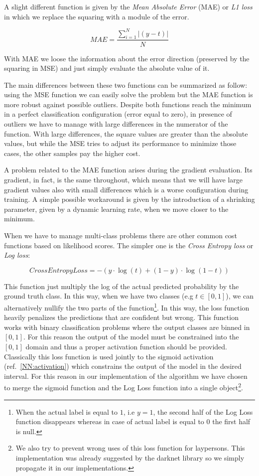\documentclass{standalone}
\begin{document}
A slight different function is given by the \emph{Mean Absolute Error} (MAE) or \emph{L1 loss} in which we replace the squaring with a module of the error.

$$
MAE = \frac{\sum_{i=1}^{N}|\left( y - t \right)|}{N}
$$

With MAE we loose the information about the error direction (preserved by the squaring in MSE) and just simply evaluate the absolute value of it.

The main differences between these two functions can be summarized as follow: using the MSE function we can easily solve the problem but the MAE function is more robust against possible outliers.
Despite both functions reach the minimum in a perfect classification configuration (error equal to zero), in presence of outliers we have to manage with large differences in the numerator of the function.
With large differences, the square values are greater than the absolute values, but while the MSE tries to adjust its performance to minimize those cases, the other samples pay the higher cost.

A problem related to the MAE function arises during the gradient evaluation.
Its gradient, in fact, is the same throughout, which means that we will have large gradient values also with small differences which is a worse configuration during training.
A simple possible workaround is given by the introduction of a shrinking parameter, given by a dynamic learning rate, when we move closer to the minimum.

When we have to manage multi-class problems there are other common cost functions based on likelihood scores.
The simpler one is the \emph{Cross Entropy loss} or \emph{Log loss}:

$$
CrossEntropyLoss = -(y\cdot\log(t) + (1 - y)\cdot\log(1 - t))
$$

This function just multiply the log of the actual predicted probability by the ground truth class.
In this way, when we have two classes (e.g $t \in [0, 1]$), we can alternatively nullify the two parts of the function\footnote{
  When the actual label is equal to $1$, i.e $y=1$, the second half of the Log Loss function disappears whereas in case of actual label is equal to $0$ the first half is null.
}.
In this way, the loss function heavily penalizes the predictions that are confident but wrong.
This function works with binary classification problems where the output classes are binned in $[0, 1]$.
For this reason the output of the model must be constrained into the $[0, 1]$ domain and thus a proper activation function should be provided.
Classically this loss function is used jointly to the sigmoid activation (ref.~\ref{NN:activation}) which constrains the output of the model in the desired interval.
For this reason in our implementation of the algorithm we have chosen to merge the sigmoid function and the Log Loss function into a single object\footnote{
  We also try to prevent wrong uses of this loss function for laypersons.
  This implementation was already suggested by the \textsf{darknet} library so we simply propagate it in our implementations.
}.
\end{document}
